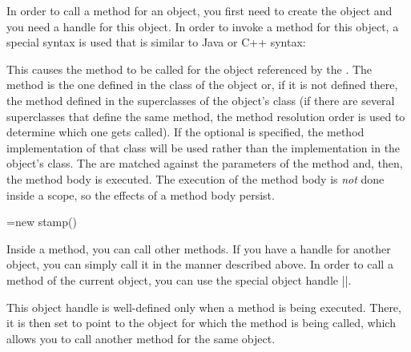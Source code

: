 In order to call a method for an object, you first need to create the object
and you need a handle for this object. In order to invoke a method for this
object, a special syntax is used that is similar to Java or C++ syntax:

\begin{pgfmanualentry}
    \pgfmanualbody
    This causes the method  to be called for the object
    referenced by the . The method is the one defined in
    the class of the object or, if it is not defined there, the method defined
    in the superclasses of the object's class (if there are several
    superclasses that define the same method, the method resolution order is
    used to determine which one gets called). If the optional  is specified, the method implementation of that class will be used
    rather than the implementation in the object's class. The 
    are matched against the parameters of the method and, then, the method body
    is executed. The execution of the method body is \emph{not} done inside a
    scope, so the effects of a method body persist.
\begin{codeexample}

\pgfoonew \mystamp=new stamp()

\end{codeexample}

    Inside a method, you can call other methods. If you have a handle for
    another object, you can simply call it in the manner described above. In
    order to call a method of the current object, you can use the special
    object handle |\pgfoothis|.

    \begin{command}{\pgfoothis}
        This object handle is well-defined only when a method is being executed.
        There, it is then set to point to the object for which the method is
        being called, which allows you to call another method for the same
        object.
\begin{codeexample}
\end{codeexample}
\end{command}
\end{pgfmanualentry}
